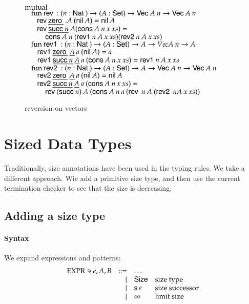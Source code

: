 \begin{figure} 
$\mathrm{mutual}\: $ \\
$\hspace*{3mm} \mathrm{fun}\: \mathsf{rev}\: : ( n : \mathsf{Nat}\:  ) \rightarrow{( A : \mathsf{Set}) \rightarrow{\mathsf{Vec}\:A \: n \rightarrow\mathsf{Vec}\:A \: n}}$\\
$\spc \spc \rev \inacc{\zero} \: .A  \: (\nil A) = \nil A $\\
$\spc \spc \rev \inacc{\suc n} \: A (\cons A \: n \: x \: xs) = $\\
$\spcx \cons A \: n \: (\reva n \: A \: x \: xs) (\revb n \: A \: x \: xs) $ \\
$\hspace*{3mm} \mathrm{fun}\: \mathsf{rev1}\: : ( n : \mathsf{Nat}\: ) \rightarrow( A : \mathsf{Set} ) \rightarrow{A \rightarrow Vec A \: n \rightarrow A}$\\
$\spc \spc \reva \inacc{\zero} \: \inacc{A} \: a \: (\nil A) = a $\\
$\spc \spc \reva \inacc{\suc n} \: \inacc{A} \: a \: (\cons A \: n \: x \: xs) = \reva n \: A \: x \: xs $\\
$\hspace*{3mm} \mathrm{fun}\: \mathsf{rev2}\: : ( n : \mathsf{Nat}\: ) \rightarrow{( A : \mathsf{Set}) \rightarrow{A \rightarrow\mathsf{Vec}\:A \: n \rightarrow\mathsf{Vec}\:A \: n}}$\\
$ \spc \spc \revb \inacc{\zero} \: \inacc{A}  \: a \: (\nil A) = \nil A $\\
$ \spc \spc \revb \inacc{\suc n} \: \inacc{A} \: a \: (\cons A \: n \: x \: xs) = $\\
$ \spcx \rev (\suc n) \: A \: (\cons A \: n \: a \: (\rev \: n \: A \: (\revb \: n A \: x \: xs))$
\caption{reversion on vectors}  
\end{figure}  

\chapter{Sized Data Types}
Traditionally, size annotations have been used in the typing rules.
We take a different approach.
Wie add a primitive size type, and then use the current termination checker to see that the size is 
decreasing.

\section{Adding a size type}
\subsubsection{Syntax}
We expand expressions and patterns:
\[
\begin{array}{lrll}
\operatorname{EXPR} \ni e,A,B & ::= & \ldots & \\
& \mid & \mathsf{Size} & \mbox{size type} \\
& \mid & \mathsf{s}\, e  & \mbox{size successor}\\ 
& \mid & \infty & \mbox{limit size}\\
\end{array}
\]

